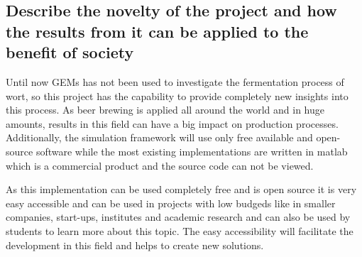
\subsection*{Describe the novelty of the project and how the results from it can be applied to the benefit of society}

Until now GEMs has not been used to investigate the fermentation process of wort, so this project has the capability to provide completely
new insights into this process. As beer brewing is applied all around the world and in huge amounts, results in this field can have a big
impact on production processes.
Additionally, the simulation framework will use only free available and open-source software while the most existing implementations are written in matlab
which is a commercial product and the source code can not be viewed.


As this implementation can be used completely free and is open source it is very easy accessible and can be used in projects with low budgeds
like in smaller companies, start-ups, institutes and academic research and can also be used by students to learn more about this topic.
The easy accessibility will facilitate the development in this field and helps to create new solutions.



